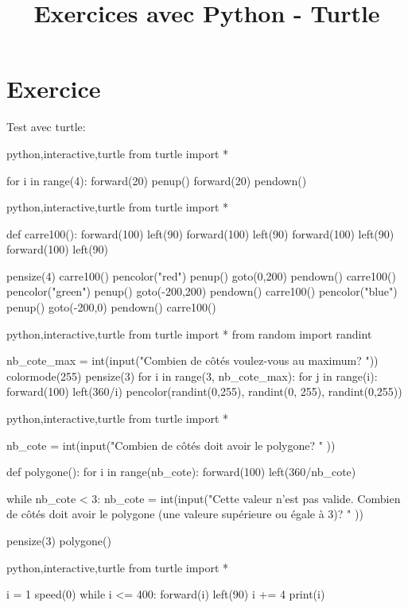 \documentclass[a4paper,11pt]{article}
\begin{document}
\title{Exercices avec Python - Turtle}
\date{}
\maketitle

\section{Exercice}
Test avec turtle:\\
\begin{solution}
\begin{code}{python,interactive,turtle}
from turtle import *

for i in range(4):
    forward(20)
    penup()
    forward(20)
    pendown()
\end{code}
\end{solution}

\begin{solution}
\begin{code}{python,interactive,turtle}
from turtle import *

def carre100():
    forward(100)
    left(90)
    forward(100)
    left(90)
    forward(100)
    left(90)
    forward(100)
    left(90)

pensize(4)
carre100()
pencolor("red")
penup()
goto(0,200)
pendown()
carre100()
pencolor("green")
penup()
goto(-200,200)
pendown()
carre100()
pencolor("blue")
penup()
goto(-200,0)
pendown()
carre100()
\end{code}
\end{solution}

\begin{solution}
\begin{code}{python,interactive,turtle}
from turtle import *
from random import randint

nb_cote_max = int(input("Combien de côtés voulez-vous au maximum? "))
colormode(255)
pensize(3)
for i in range(3, nb_cote_max):
    for j in range(i):
        forward(100)
        left(360/i)
    pencolor(randint(0,255), randint(0, 255), randint(0,255))
\end{code}
\end{solution}

\begin{solution}
\begin{code}{python,interactive,turtle}
from turtle import *

nb_cote = int(input("Combien de côtés doit avoir le polygone? " ))

def polygone():
    for i in range(nb_cote):
        forward(100)
        left(360/nb_cote)

while nb_cote < 3:
    nb_cote = int(input("Cette valeur n'est pas valide. Combien de côtés doit avoir le polygone (une valeure supérieure ou égale à 3)? " ))

pensize(3)
polygone()
\end{code}
\end{solution}

\begin{solution}
\begin{code}{python,interactive,turtle}
from turtle import *

i = 1
speed(0)
while i <= 400:
    forward(i)
    left(90)
    i += 4
    print(i)
\end{code}
\end{solution}
\end{document}
